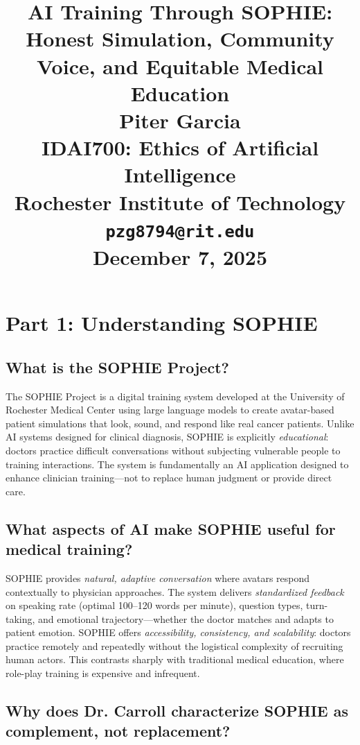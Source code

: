 \documentclass[12pt,twoside]{article}
\title{
\vspace*{1.5in}
\textbf{\Huge AI Training Through SOPHIE:}\\[0.5em]
\textbf{\Huge Honest Simulation, Community Voice, and Equitable Medical Education}\\[1.5em]

\vfill
\Huge \textbf{Piter Garcia}\\
\LARGE IDAI700: Ethics of Artificial Intelligence\\
Rochester Institute of Technology\\
\texttt{pzg8794@rit.edu}\\

\vfill
\Huge \textbf{December 7, 2025}
}
\author{}
\date{}
\begin{document}
\thispagestyle{empty}
\maketitle
\newpage

\pagestyle{fancy}

\section*{Part 1: Understanding SOPHIE}

\subsection*{What is the SOPHIE Project?}

The SOPHIE Project is a digital training system developed at the University of Rochester Medical Center using large language models to create avatar-based patient simulations that look, sound, and respond like real cancer patients. Unlike AI systems designed for clinical diagnosis, SOPHIE is explicitly \emph{educational}: doctors practice difficult conversations without subjecting vulnerable people to training interactions. The system is fundamentally an AI application designed to enhance clinician training—not to replace human judgment or provide direct care.

\subsection*{What aspects of AI make SOPHIE useful for medical training?}

SOPHIE provides \emph{natural, adaptive conversation} where avatars respond contextually to physician approaches. The system delivers \emph{standardized feedback} on speaking rate (optimal 100--120 words per minute), question types, turn-taking, and emotional trajectory—whether the doctor matches and adapts to patient emotion. SOPHIE offers \emph{accessibility, consistency, and scalability}: doctors practice remotely and repeatedly without the logistical complexity of recruiting human actors. This contrasts sharply with traditional medical education, where role-play training is expensive and infrequent.

\subsection*{Why does Dr. Carroll characterize SOPHIE as complement, not replacement?}
\end{document}
